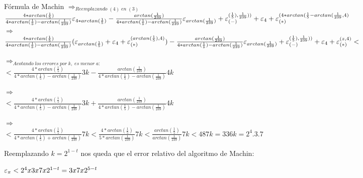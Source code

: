 \begin{section}{Fórmula de Machin}
	$\Rightarrow_{Reemplazando \; (4) \; en \; (3)}$\\
	
	$\frac{4*arctan(\frac{1}{5})}{4*arctan(\frac{1}{5})-arctan(\frac{1}{239})}\varepsilon _{4*arctan(\frac{1}{5})} - \frac{arctan(\frac{1}{239})}{4*arctan(\frac{1}{5})-arctan(\frac{1}{239})}\varepsilon _{arctan(\frac{1}{239})} + \varepsilon _{({-})}^{({\frac{1}{5}),\frac{1}{239})})} + \varepsilon _{4} + \varepsilon _{({*})}^{({4*arctan(\frac{1}{5}-arctan(\frac{1}{239},4})}$\\
	
	$\Rightarrow$\\
	
	$\frac{4*arctan(\frac{1}{5})}{4*arctan(\frac{1}{5})-arctan(\frac{1}{239})}(\varepsilon _{arctan(\frac{1}{5})}+\varepsilon _{4}+\varepsilon _{({*})}^{({arctan(\frac{1}{5}),4})}) - \frac{arctan(\frac{1}{239})}{4*arctan(\frac{1}{5})-arctan(\frac{1}{239})}\varepsilon _{arctan(\frac{1}{239})} + \varepsilon _{({-})}^{({\frac{1}{5}),\frac{1}{239})})} + \varepsilon _{4} + \varepsilon _{({*})}^{({z,4})} < $
	
	$\Rightarrow_{Acotando \; los \; errores \; por \; k, \; es \; menor \; a:}$\\
	
	$< \frac{4*arctan(\frac{1}{5})}{4*arctan(\frac{1}{5})-arctan(\frac{1}{239})}3k - \frac{arctan(\frac{1}{239})}{4*arctan(\frac{1}{5})-arctan(\frac{1}{239})}4k $
	
	$\Rightarrow$\\
	
	$< \frac{4*arctan(\frac{1}{5})}{4*arctan(\frac{1}{5})-arctan(\frac{1}{239})}3k + \frac{arctan(\frac{1}{239})}{4*arctan(\frac{1}{5})-arctan(\frac{1}{239})}4k $
	
	$\Rightarrow$\\
	
	$< \frac{4*arctan(\frac{1}{5})}{4*arctan(\frac{1}{5})+arctan(\frac{1}{239})}7k < \frac{4*arctan(\frac{1}{5})}{5*arctan(\frac{1}{239})}7k < \frac{arctan(\frac{1}{5})}{arctan(\frac{1}{239})}7k < 48 7k = 336k = 2^{4}.3.7$
	
	Reemplazando $k=2^{1-t}$ nos queda que el error relativo del algoritmo de Machin:
	
		$\varepsilon _{\pi} < 2^{4} x 3 x 7 x 2^{1-t} = 3 x 7 x 2^{5-t}$
	
	
\end{section}
